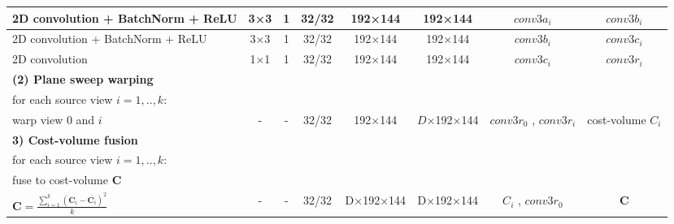 \begin{table}[htbp]
\begin{adjustbox}{width=1\textwidth}
\begin{tabular}{|l|c|c|c|c|c|c|c|}
\hspace{0.75cm}2D convolution + BatchNorm + ReLU                            & 3×3             & 1               & 32/32         & 192×144         & 192×144          & $conv3a_i$             & $conv3b_i$          \\ \hline
\hspace{0.75cm}2D convolution + BatchNorm + ReLU                            & 3×3             & 1               & 32/32        & 192×144          & 192×144           & $conv3b_i$            & $conv3c_i$         \\ \hline
\hspace{0.75cm}2D convolution                            & 1×1             & 1               & 32/32        & 192×144          & 192×144           & $conv3c_i$            & $conv3r_i$         \\ \hline
\hline
\rowcolor{bgcolor}
\textbf{(2) Plane sweep warping}   &                 &                 &                 &                 &                 &                    &                 \\ \hline
for each source view $i = 1, .., k:$     &                 &                 &                 &                 &                 &                    &                 \\ \hline
\hspace{0.75cm}warp view $0$ and $i$                & -               & -               & 32/32     & 192×144           & $D$×192×144           & $conv3r_0$ , $conv3r_i$  & cost-volume $C_i$   \\ \hline
\hline
\rowcolor{bgcolor}
\textbf{3) Cost-volume fusion}          &                 &                 &                 &                 &                 &                    &                 \\ \hline
for each source view $i = 1, .., k:$ &                 &                 &                 &                 &                 &                    &                 \\ \hline
\hspace{0.5cm}fuse to cost-volume $\textbf{C}$               &                 &                 &                 &                 &                 &                    &                 \\ \hline
\hspace{0.5cm}$\mathbf{C} = \frac{\sum\limits_{i=1}^k{(\mathbf{C}_i - \overbar{\mathbf{C}_i})^2}}{k}$\cite{Yao2018}      & -               & -               & 32/32         & D×192×144           & D×192×144            & $C_i$ , $conv3r_0$            & $\textbf{C}$               \\ \hline

\end{tabular}
\end{adjustbox}
\end{table}
